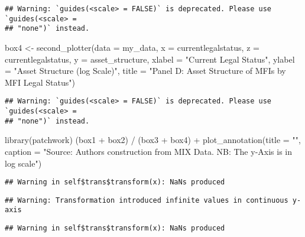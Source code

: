 \documentclass[a4paper,nobind]{templates/ociamthesis}
\newenvironment{Shaded}{\begin{snugshade}}{\end{snugshade}}
\newcommand{\AttributeTok}[1]{\textcolor[rgb]{0.77,0.63,0.00}{#1}}
\newcommand{\FunctionTok}[1]{\textcolor[rgb]{0.00,0.00,0.00}{#1}}
\newcommand{\NormalTok}[1]{#1}
\newcommand{\OtherTok}[1]{\textcolor[rgb]{0.56,0.35,0.01}{#1}}
\newcommand{\SpecialCharTok}[1]{\textcolor[rgb]{0.00,0.00,0.00}{#1}}
\newcommand{\StringTok}[1]{\textcolor[rgb]{0.31,0.60,0.02}{#1}}
\renewenvironment{Shaded}
{
  \vspace{10pt}%
  \begin{snugshade}%
}{%
  \end{snugshade}%
  \vspace{8pt}%
}
\begin{document}
\begin{landscape}
\begin{verbatim}
## Warning: `guides(<scale> = FALSE)` is deprecated. Please use `guides(<scale> =
## "none")` instead.
\end{verbatim}

\begin{Shaded}
\begin{Highlighting}[]
\NormalTok{box4 }\OtherTok{\textless{}{-}} \FunctionTok{second\_plotter}\NormalTok{(}\AttributeTok{data =}\NormalTok{ my\_data, }\AttributeTok{x =}\NormalTok{ currentlegalstatus, }
        \AttributeTok{z =}\NormalTok{ currentlegalstatus,}
        \AttributeTok{y =}\NormalTok{ asset\_structure, }
        \AttributeTok{xlabel =} \StringTok{"Current Legal Status"}\NormalTok{, }
        \AttributeTok{ylabel =} \StringTok{"Asset Structure (log Scale)"}\NormalTok{, }
        \AttributeTok{title =} \StringTok{"Panel D: Asset Structure of MFIs by MFI Legal Status"}\NormalTok{)}
\end{Highlighting}
\end{Shaded}

\begin{verbatim}
## Warning: `guides(<scale> = FALSE)` is deprecated. Please use `guides(<scale> =
## "none")` instead.
\end{verbatim}

\begin{Shaded}
\begin{Highlighting}[]
\FunctionTok{library}\NormalTok{(patchwork)}
\NormalTok{(box1 }\SpecialCharTok{+}\NormalTok{ box2) }\SpecialCharTok{/}\NormalTok{ (box3 }\SpecialCharTok{+}\NormalTok{ box4) }\SpecialCharTok{+} \FunctionTok{plot\_annotation}\NormalTok{(}\AttributeTok{title =} \StringTok{""}\NormalTok{, }\AttributeTok{caption =} \StringTok{"Source: Authors\textquotesingle{} construction from MIX Data. NB: The y{-}Axis is in log scale"}\NormalTok{)}
\end{Highlighting}
\end{Shaded}

\begin{verbatim}
## Warning in self$trans$transform(x): NaNs produced
\end{verbatim}

\begin{verbatim}
## Warning: Transformation introduced infinite values in continuous y-axis
\end{verbatim}

\begin{verbatim}
## Warning in self$trans$transform(x): NaNs produced
\end{verbatim}


\end{landscape}
\end{document}
